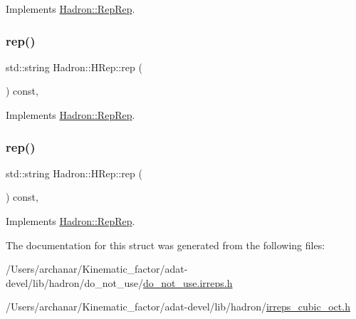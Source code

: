 Implements \mbox{\hyperlink{structHadron_1_1RepRep_ab3213025f6de249f7095892109575fde}{Hadron\+::\+Rep\+Rep}}.

\mbox{\label{structHadron_1_1HRep_aa90a43bdbf19213e75180e0457ae36d0}} 
\subsubsection{\texorpdfstring{rep()}{rep()}\hspace{0.1cm}{\footnotesize\ttfamily [4/5]}}
{\footnotesize\ttfamily std\+::string Hadron\+::\+H\+Rep\+::rep (\begin{DoxyParamCaption}{ }\end{DoxyParamCaption}) const\hspace{0.3cm}{\ttfamily [inline]}, {\ttfamily [virtual]}}



Implements \mbox{\hyperlink{structHadron_1_1RepRep_ab3213025f6de249f7095892109575fde}{Hadron\+::\+Rep\+Rep}}.

\mbox{\label{structHadron_1_1HRep_aa90a43bdbf19213e75180e0457ae36d0}} 
\subsubsection{\texorpdfstring{rep()}{rep()}\hspace{0.1cm}{\footnotesize\ttfamily [5/5]}}
{\footnotesize\ttfamily std\+::string Hadron\+::\+H\+Rep\+::rep (\begin{DoxyParamCaption}{ }\end{DoxyParamCaption}) const\hspace{0.3cm}{\ttfamily [inline]}, {\ttfamily [virtual]}}



Implements \mbox{\hyperlink{structHadron_1_1RepRep_ab3213025f6de249f7095892109575fde}{Hadron\+::\+Rep\+Rep}}.



The documentation for this struct was generated from the following files\+:\begin{DoxyCompactItemize}
\item 
/\+Users/archanar/\+Kinematic\+\_\+factor/adat-\/devel/lib/hadron/do\+\_\+not\+\_\+use/\mbox{\hyperlink{adat-devel_2lib_2hadron_2do__not__use_2do__not__use_8irreps_8h}{do\+\_\+not\+\_\+use.\+irreps.\+h}}\item 
/\+Users/archanar/\+Kinematic\+\_\+factor/adat-\/devel/lib/hadron/\mbox{\hyperlink{adat-devel_2lib_2hadron_2irreps__cubic__oct_8h}{irreps\+\_\+cubic\+\_\+oct.\+h}}\end{DoxyCompactItemize}
